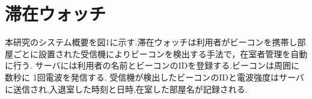 
\section{滞在ウォッチ}
\label{sec:const}
本研究のシステム概要を図1に示す.滞在ウォッチは利用者がビーコンを携帯し部屋ごとに設置された受信機によりビーコンを検出する手法で，在室者管理を自動に行う.
サーバには利用者の名前とビーコンのIDを登録する.ビーコンは周囲に数秒に 1回電波を発信する.
受信機が検出したビーコンのIDと電波強度はサーバに送信され,入退室した時刻と日時,在室した部屋名が記録される.